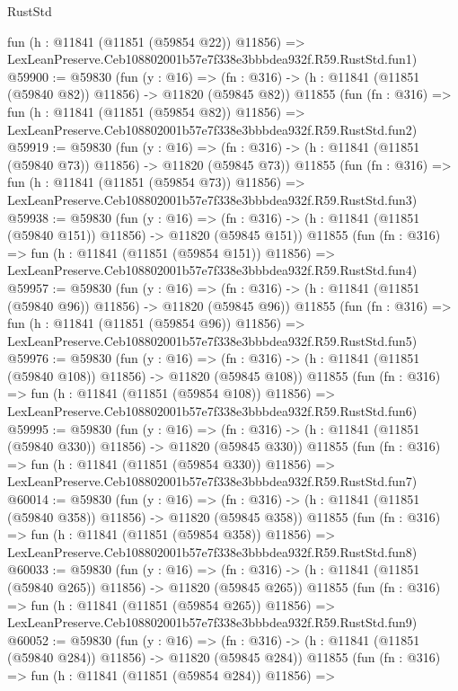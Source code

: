 \begin{lexlean}{RustStd}
\begin{coremodule}
    fun (h : @11841 (@11851 (@59854 @22)) @11856) =>
    LexLeanPreserve.Ceb108802001b57e7f338e3bbbdea932f.R59.RustStd.fun1)
@59900 := @59830
    (fun (y : @16) =>
    (fn : @316) -> (h : @11841 (@11851 (@59840 @82)) @11856) -> @11820 (@59845 @82))
    @11855
    (fun (fn : @316) =>
    fun (h : @11841 (@11851 (@59854 @82)) @11856) =>
    LexLeanPreserve.Ceb108802001b57e7f338e3bbbdea932f.R59.RustStd.fun2)
@59919 := @59830
    (fun (y : @16) =>
    (fn : @316) -> (h : @11841 (@11851 (@59840 @73)) @11856) -> @11820 (@59845 @73))
    @11855
    (fun (fn : @316) =>
    fun (h : @11841 (@11851 (@59854 @73)) @11856) =>
    LexLeanPreserve.Ceb108802001b57e7f338e3bbbdea932f.R59.RustStd.fun3)
@59938 := @59830
    (fun (y : @16) =>
    (fn : @316) -> (h : @11841 (@11851 (@59840 @151)) @11856) -> @11820 (@59845 @151))
    @11855
    (fun (fn : @316) =>
    fun (h : @11841 (@11851 (@59854 @151)) @11856) =>
    LexLeanPreserve.Ceb108802001b57e7f338e3bbbdea932f.R59.RustStd.fun4)
@59957 := @59830
    (fun (y : @16) =>
    (fn : @316) -> (h : @11841 (@11851 (@59840 @96)) @11856) -> @11820 (@59845 @96))
    @11855
    (fun (fn : @316) =>
    fun (h : @11841 (@11851 (@59854 @96)) @11856) =>
    LexLeanPreserve.Ceb108802001b57e7f338e3bbbdea932f.R59.RustStd.fun5)
@59976 := @59830
    (fun (y : @16) =>
    (fn : @316) -> (h : @11841 (@11851 (@59840 @108)) @11856) -> @11820 (@59845 @108))
    @11855
    (fun (fn : @316) =>
    fun (h : @11841 (@11851 (@59854 @108)) @11856) =>
    LexLeanPreserve.Ceb108802001b57e7f338e3bbbdea932f.R59.RustStd.fun6)
@59995 := @59830
    (fun (y : @16) =>
    (fn : @316) -> (h : @11841 (@11851 (@59840 @330)) @11856) -> @11820 (@59845 @330))
    @11855
    (fun (fn : @316) =>
    fun (h : @11841 (@11851 (@59854 @330)) @11856) =>
    LexLeanPreserve.Ceb108802001b57e7f338e3bbbdea932f.R59.RustStd.fun7)
@60014 := @59830
    (fun (y : @16) =>
    (fn : @316) -> (h : @11841 (@11851 (@59840 @358)) @11856) -> @11820 (@59845 @358))
    @11855
    (fun (fn : @316) =>
    fun (h : @11841 (@11851 (@59854 @358)) @11856) =>
    LexLeanPreserve.Ceb108802001b57e7f338e3bbbdea932f.R59.RustStd.fun8)
@60033 := @59830
    (fun (y : @16) =>
    (fn : @316) -> (h : @11841 (@11851 (@59840 @265)) @11856) -> @11820 (@59845 @265))
    @11855
    (fun (fn : @316) =>
    fun (h : @11841 (@11851 (@59854 @265)) @11856) =>
    LexLeanPreserve.Ceb108802001b57e7f338e3bbbdea932f.R59.RustStd.fun9)
@60052 := @59830
    (fun (y : @16) =>
    (fn : @316) -> (h : @11841 (@11851 (@59840 @284)) @11856) -> @11820 (@59845 @284))
    @11855
    (fun (fn : @316) =>
    fun (h : @11841 (@11851 (@59854 @284)) @11856) =>

\end{coremodule}
\end{lexlean}
